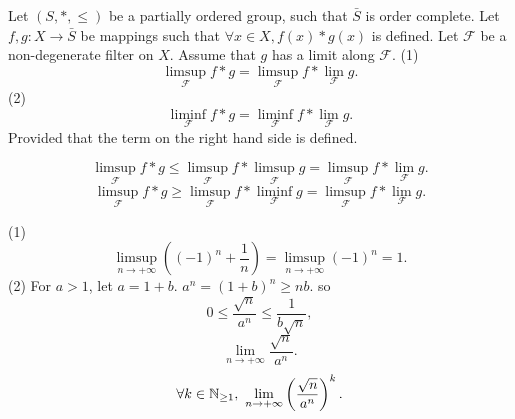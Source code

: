 \begin{corollaryenv}
    Let $(S,*,\le)$ be a partially ordered group, such that $\bar{S}$ is order complete. Let $f,g: X\longrightarrow \bar{S}$ be mappings such that $\forall x\in X, f(x)*g(x)$ is defined. Let $\mathcal{F}$ be a  non-degenerate filter on $X$. Assume that $g$ has a limit along $\mathcal{F}$.
    \newline
    (1) $$\limsup_{\mathcal{F}}f*g=\limsup_{\mathcal{F}}f*\lim_{\mathcal{F}}g.$$
    (2) $$\liminf_{\mathcal{F}}f*g=\liminf_{\mathcal{F}}f*\lim_{\mathcal{F}}g.$$
    Provided that the term on the right hand side is defined.
\end{corollaryenv}
\begin{proofenv}
 $$\limsup_{\mathcal{F}}f*g\le \limsup_{\mathcal{F}}f*\limsup_{\mathcal{F}}g=\limsup_{\mathcal{F}}f*\lim_{\mathcal{F}}g.$$
    $$\limsup_{\mathcal{F}}f*g\ge \limsup_{\mathcal{F}}f*\liminf_{\mathcal{F}}g=\limsup_{\mathcal{F}}f*\lim_{\mathcal{F}}g.$$
\end{proofenv}
\begin{exampleenv}
    \quad \newline
    (1)
    $$\limsup_{n\rightarrow+\infty}\left((-1)^n+\frac{1}{n}\right)=\limsup_{n\rightarrow+\infty}(-1)^n=1.$$
    (2) For $a>1$, let $a=1+b$. $a^n=(1+b)^n\ge nb$. so 
    $$0\le \frac{\sqrt{n}}{a^n}\le \frac{1}{b\sqrt{n}},$$
    $$\lim_{n\rightarrow +\infty}\frac{\sqrt{n}}{a^n}.$$
    $$\forall k\in \NN_{\ge 1}, \ \lim_{n\rightarrow+\infty}\left(\frac{\sqrt{n}}{a^n}\right)^k.$$
\end{exampleenv}
